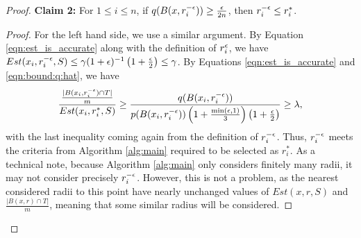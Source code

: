 \begin{proof}
\textbf{Claim 2:} For $1 \leq i \leq n$, if $q(B(x, r_i^{-\epsilon})) \geq \frac{\epsilon}{2n}$, then $r_i^{-\epsilon} \leq r_i^*$. 

\begin{proof}
For the left hand side, we use a similar argument. By Equation \ref{eqn:est_is_accurate} along with the definition of $r_i^\epsilon$, we have $Est(x_i, r_i^{-\epsilon}, S) \leq \gamma(1+\epsilon)^{-1} \left(1 + \frac{\epsilon}{2}\right) \leq \gamma$. By Equations \ref{eqn:est_is_accurate} and \ref{eqn:bound:q:hat}, we have
\begin{equation*}
\frac{\frac{|B(x_i, r_i^{-\epsilon}) \cap T|}{m}}{Est(x_i, r_i^*, S)} \geq  \frac{q(B(x_i, r_i^{-\epsilon}))}{p(B(x_i, r_i^{-\epsilon}))\left(1 + \frac{\min(\epsilon, 1)}{3}\right)\left(1 + \frac{\epsilon}{2}\right)} \geq \lambda,
\end{equation*}
with the last inequality coming again from the definition of $r_i^{-\epsilon}$. Thus, $r_i^{-\epsilon}$ meets the criteria from Algorithm \ref{alg:main} required to be selected as $r_i^*$. As a technical note, because Algorithm \ref{alg:main} only considers finitely many radii, it may not consider precisely $r_i^{-\epsilon}$. However, this is not a problem, as the nearest considered radii to this point have nearly unchanged values of $Est(x, r, S)$ and $\frac{|B(x, r) \cap T|}{m}$, meaning that some similar radius will be considered. 
\end{proof}


\end{proof}
